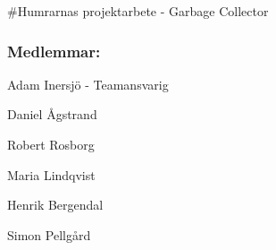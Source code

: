 \#\-Humrarnas projektarbete -\/ Garbage Collector

\subsubsection*{Medlemmar\-:}


\begin{DoxyItemize}
\item Adam Inersjö -\/ Teamansvarig
\item Daniel Ågstrand
\item Robert Rosborg
\item Maria Lindqvist
\item Henrik Bergendal
\item Simon Pellgård 
\end{DoxyItemize}